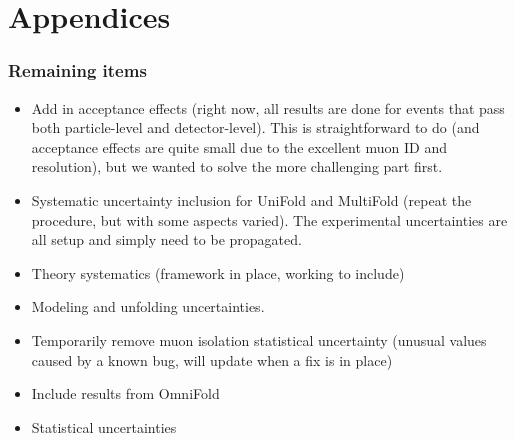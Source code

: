\documentclass[NOTE, atlasdraft=true, texlive=2016, UKenglish]{\ATLASLATEXPATH atlasdoc}
\begin{document}
\printbibliography
%
%

\clearpage


\clearpage
\appendix
\part*{Appendices}

\section{Remaining items}

\begin{itemize}
  \item Add in acceptance effects (right now, all results are done for events that pass both particle-level and detector-level).  This is straightforward to do (and acceptance effects are quite small due to the excellent muon ID and resolution), but we wanted to solve the more challenging part first.
  \item Systematic uncertainty inclusion for UniFold and MultiFold (repeat the procedure, but with some aspects varied).  The experimental uncertainties are all setup and simply need to be propagated.
  \item Theory systematics (framework in place, working to include)
  \item Modeling and unfolding uncertainties.
  \item Temporarily remove muon isolation statistical uncertainty (unusual values caused by a known bug, will update when a fix is in place)
  \item Include results from OmniFold
  \item Statistical uncertainties
\end{itemize}
\end{document}
